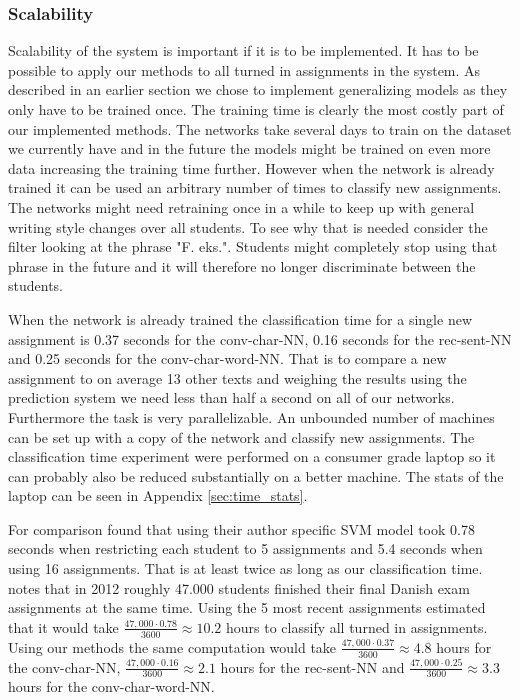 \subsubsection{Scalability}

Scalability of the system is important if it is to be implemented. It has to be
possible to apply our methods to all turned in assignments in the system. As
described in an earlier section we chose to implement generalizing models as
they only have to be trained once. The training time is clearly the most costly
part of our implemented methods. The networks take several days to train on
the dataset we currently have and in the future the models might be trained on
even more data increasing the training time further. However when the network
is already trained it can be used an arbitrary number of times to classify
new assignments. The networks might need retraining once in a while to keep
up with general writing style changes over all students. To see why that is
needed consider the filter looking at the phrase "F. eks.". Students might
completely stop using that phrase in the future and it will therefore no longer
discriminate between the students.

When the network is already trained the classification time for a single new
assignment is 0.37 seconds for the \gls{conv-char-NN}, 0.16 seconds for the
\gls{rec-sent-NN} and 0.25 seconds for the \gls{conv-char-word-NN}. That is to
compare a new assignment to on average 13 other texts and weighing the results
using the prediction system we need less than half a second on all of our
networks. Furthermore the task is very parallelizable. An unbounded number of
machines can be set up with a copy of the network and classify new assignments.
The classification time experiment were performed on a consumer grade laptop so
it can probably also be reduced substantially on a better machine. The stats
of the laptop can be seen in Appendix \ref{sec:time_stats}.

For comparison \citet{hansen2014} found that using their author specific
\gls{SVM} model took 0.78 seconds when restricting each student to 5 assignments
and 5.4 seconds when using 16 assignments. That is at least twice as long as
our classification time. \citet{hansen2014} notes that in 2012 roughly 47.000
students finished their final Danish exam assignments at the same time. Using
the 5 most recent assignments \citet{hansen2014} estimated that it would take
$\frac{47,000 \cdot 0.78}{3600} \approx 10.2$ hours to classify all turned in
assignments. Using our methods the same computation would take $\frac{47,000
\cdot 0.37}{3600} \approx 4.8$ hours for the \gls{conv-char-NN}, $\frac{47,000
\cdot 0.16}{3600} \approx 2.1$ hours for the \gls{rec-sent-NN} and $\frac{47,000
\cdot 0.25}{3600} \approx 3.3$ hours for the \gls{conv-char-word-NN}.


